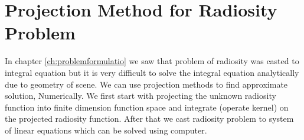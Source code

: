

\chapter{\label{ch:projection}Projection Method for Radiosity Problem}
In chapter \ref{ch:problemformulatio} we saw that problem of radiosity was casted to integral equation but it is very difficult to solve the integral equation analytically due to geometry of scene. We can use projection methods to find approximate solution, Numerically. We first start with projecting the unknown radiosity function into finite dimension function space and integrate (operate kernel) on the projected radiosity function. After that we cast radiosity problem to system of linear equations which can be solved using computer. \\

